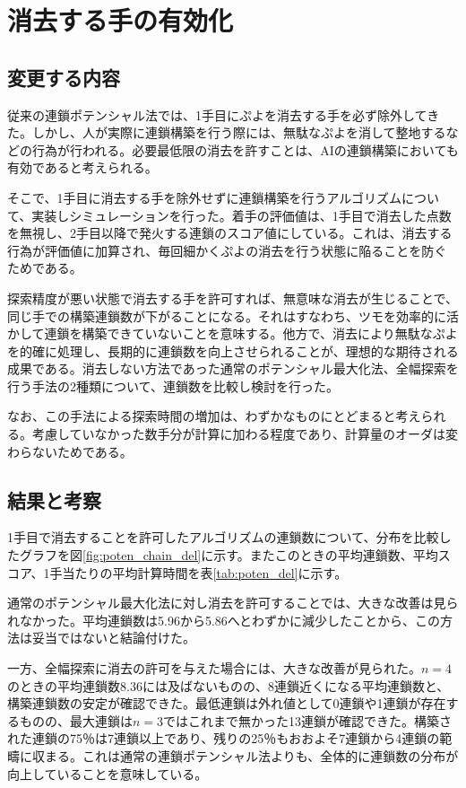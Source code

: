 \documentclass[12pt]{jreport}
\begin{document}
\section{消去する手の有効化}
\subsection{変更する内容}
従来の連鎖ポテンシャル法では、1手目にぷよを消去する手を必ず除外してきた。しかし、人が実際に連鎖構築を行う際には、無駄なぷよを消して整地するなどの行為が行われる。必要最低限の消去を許すことは、AIの連鎖構築においても有効であると考えられる。

そこで、1手目に消去する手を除外せずに連鎖構築を行うアルゴリズムについて、実装しシミュレーションを行った。着手の評価値は、1手目で消去した点数を無視し、2手目以降で発火する連鎖のスコア値にしている。これは、消去する行為が評価値に加算され、毎回細かくぷよの消去を行う状態に陥ることを防ぐためである。

探索精度が悪い状態で消去する手を許可すれば、無意味な消去が生じることで、同じ手での構築連鎖数が下がることになる。それはすなわち、ツモを効率的に活かして連鎖を構築できていないことを意味する。他方で、消去により無駄なぷよを的確に処理し、長期的に連鎖数を向上させられることが、理想的な期待される成果である。消去しない方法であった通常のポテンシャル最大化法、全幅探索を行う手法の2種類について、連鎖数を比較し検討を行った。

なお、この手法による探索時間の増加は、わずかなものにとどまると考えられる。考慮していなかった数手分が計算に加わる程度であり、計算量のオーダは変わらないためである。

\subsection{結果と考察}
1手目で消去することを許可したアルゴリズムの連鎖数について、分布を比較したグラフを図\ref{fig:poten_chain_del}に示す。またこのときの平均連鎖数、平均スコア、1手当たりの平均計算時間を表\ref{tab:poten_del}に示す。

通常のポテンシャル最大化法に対し消去を許可することでは、大きな改善は見られなかった。平均連鎖数は5.96から5.86へとわずかに減少したことから、この方法は妥当ではないと結論付けた。

一方、全幅探索に消去の許可を与えた場合には、大きな改善が見られた。$n=4$のときの平均連鎖数8.36には及ばないものの、8連鎖近くになる平均連鎖数と、構築連鎖数の安定が確認できた。最低連鎖は外れ値として0連鎖や1連鎖が存在するものの、最大連鎖は$n=3$ではこれまで無かった13連鎖が確認できた。構築された連鎖の75％は7連鎖以上であり、残りの25％もおおよそ7連鎖から4連鎖の範疇に収まる。これは通常の連鎖ポテンシャル法よりも、全体的に連鎖数の分布が向上していることを意味している。
\end{document}
